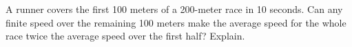 A runner covers the first 100 meters of a 200-meter race in 10 seconds. Can any finite speed over the remaining 100 meters make the average speed for the whole race twice the average speed over the first half? Explain.
